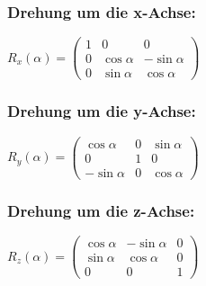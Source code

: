 \subsubsection{Drehung um die x-Achse:}
$R_x(\alpha) = \begin{pmatrix}
1 &   0         & 0           \\
0 & \cos \alpha & -\sin \alpha \\
0 & \sin \alpha &  \cos \alpha
\end{pmatrix}$
\subsubsection{Drehung um die y-Achse:}
$R_y(\alpha) = \begin{pmatrix}
\cos \alpha  & 0 & \sin \alpha \\
   0         & 1 &  0          \\
-\sin \alpha & 0 & \cos \alpha
\end{pmatrix}$
\subsubsection{Drehung um die z-Achse:}
$R_z(\alpha) = \begin{pmatrix}
\cos \alpha & -\sin \alpha & 0 \\
\sin \alpha &  \cos \alpha & 0 \\
   0        &  0           & 1
\end{pmatrix}$


